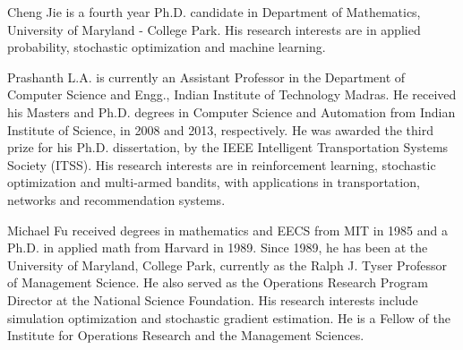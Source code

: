 \documentclass[twocolumn]{IEEEtran}
\begin{document}



\vspace{-1ex}


\begin{IEEEbiographynophoto}{Cheng Jie}
is a fourth year Ph.D. candidate in Department of Mathematics, University of Maryland - College Park. His research interests are in applied probability, stochastic optimization and machine learning. 
\end{IEEEbiographynophoto}


\begin{IEEEbiographynophoto}{Prashanth L.A.}
is currently an Assistant Professor in the Department of Computer Science and Engg., Indian Institute of Technology Madras.
He received his Masters and Ph.D. degrees in Computer Science and Automation from Indian Institute of Science, in 2008 and 2013, respectively.  He was awarded the third prize for his Ph.D. dissertation, by the IEEE Intelligent Transportation Systems Society (ITSS).
His research interests are in reinforcement learning, stochastic optimization and multi-armed bandits, with applications in transportation, networks and recommendation systems.
\end{IEEEbiographynophoto}


\begin{IEEEbiographynophoto}{Michael Fu}
received degrees in mathematics and EECS from MIT in 1985 and a Ph.D. in applied math from Harvard in 1989. Since 1989, he has been at the University of Maryland, College Park, currently as the Ralph J. Tyser Professor of Management Science.  He also served as the Operations Research Program Director at the National Science Foundation. His research interests include simulation optimization and stochastic gradient estimation. He is a Fellow of the Institute for Operations Research and the Management Sciences.
\end{IEEEbiographynophoto}
\end{document}
